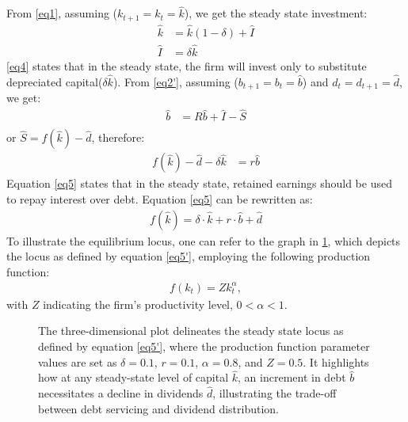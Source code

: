 \documentclass[12pt]{report}
\begin{document}
From \ref{eq1}, assuming (\(k_{t+1}=k_{t}=\widehat{k}\)), we get the steady state investment:
\begin{align}
    \widehat{k}&=\widehat{k}\left(1-\delta\right) + \widehat{I} \nonumber\\
    \widehat{I}&=\delta \widehat{k}  \label{eq4}
\end{align}
\ref{eq4} states that in the steady state, the firm will invest only to substitute depreciated capital(\(\delta
\widehat{k}\)). From \ref{eq2'},  assuming (\(b_{t+1}=b_{t} = \widehat{b}\)) and \(d_t=d_{t+1}=\hat{d} \), we get:
\begin{align}
    \widehat{b} &= R \widehat{b} + \widehat{I} - \widehat{S} \nonumber \\
\end{align}
or \(\widehat{S} = f(\hat{k}) -\hat{d}  \), therefore:
\begin{align}
    f\left(\widehat{k}\right) - \widehat{d} - \delta \widehat{k} &= r \widehat{b} \label{eq5}
\end{align}
Equation \ref{eq5} states that in the steady state, retained earnings should be used to repay
interest over debt.
Equation \ref{eq5} can be rewritten as:
\begin{align}
    f(\widehat{k}) = \delta \cdot \widehat{k} + r \cdot \widehat{b} + \widehat{d} \label{eq5'}
\end{align}
To illustrate the equilibrium locus, one can refer to the graph in \ref{fig:steadystate3d},
which depicts the locus as defined by equation \ref{eq5'}, employing the following production function:
\begin{align}
    f(k_{t}) = Z  k_{t}^\alpha, \label{eq6} 
\end{align}
 with \(Z\) indicating the firm's productivity level, \(0<\alpha<1\).  

\begin{figure}
    \centering
    
    \caption{The three-dimensional plot delineates the steady state locus as defined by equation \ref{eq5'}, where the
    production function parameter values are set as \(\delta =0.1\), \(r=0.1\), \(\alpha=0.8\), and \(Z=0.5\). It
    highlights how at any steady-state level of capital \(\widehat{k}\), an increment in debt \(\widehat{b}\) necessitates a
    decline in dividends \(\widehat{d}\), illustrating the trade-off between debt servicing and dividend distribution.}


    \label{fig:steadystate3d}
\end{figure}
\end{document}
